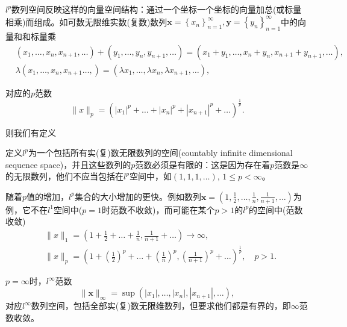 $l^p$数列空间反映这样的向量空间结构：通过一个坐标一个坐标的向量加总(或标量相乘)而组成。如可数无限维实数(复数)数列$\bm{x} = \left\{ x_n \right\}_{n=1}^{\infty}, \bm{y} = \left\{ y_n \right\}_{n=1}^{\infty}$中的向量和和标量乘
\begin{equation*}
  \begin{split}
    & \left( x_1, \ldots, x_n, x_{n+1}, \ldots \right) +
    \left( y_1, \ldots, y_n, y_{n+1}, \ldots \right)
    = \left( x_1+y_1, \ldots, x_n+y_n, x_{n+1}+y_{n+1}, \ldots \right), \\
    & \lambda \left( x_1, \ldots, x_n, x_{n+1} \ldots , \right) =
    \left( \lambda x_1, \ldots, \lambda x_n, \lambda x_{n+1} , \ldots \right),
  \end{split}
\end{equation*}

对应的$p$范数
\begin{equation*}
  \| x\|_p = \left( |x_1|^p + \ldots + |x_n|^p + |x_{n+1}|^p + \ldots \right)^{\frac{1}{p}}.
\end{equation*}

则我们有定义
\begin{definition}[可数无限维数列空间]
  \label{definition:lp-lp-infinite-def}
  定义$l^p$为一个包括所有实(复)数无限数列的空间(countably infinite dimensional sequence space)，并且这些数列的$p$范数必须是有限的：这是因为存在着$p$范数是$\infty$的无限数列，他们不应当包括在$l^{p}$空间中，如$\left( 1,1,1,\ldots \right),\, 1 \le p < \infty$。
\end{definition}

随着$p$值的增加，$l^p$集合的大小增加的更快。例如数列$\bm{x} = \left(1, \frac{1}{2}, \ldots, \frac{1}{n}, \frac{1}{n+1},\ldots \right)$为例，它不在$l^1$空间中($p=1$时范数不收敛)，而可能在某个$p>1$的$l^{p}$的空间中(范数收敛)
\begin{equation*}
\begin{split}
  &\| x \|_1 = \left( 1 + \frac{1}{2} + \ldots + \frac{1}{n}, \frac{1}{n+1} + \ldots \right) \rightarrow \infty, \\
  &\| x \|_p = \left( 1 + \left(\frac{1}{2}\right)^p + \ldots + \left( \frac{1}{n} \right)^p, \left( \frac{1}{n+1}\right)^p + \ldots \right)^{\frac{1}{p}}, \quad p >1.
\end{split}
\end{equation*}

$p = \infty$时，$l^{\infty}$范数
\begin{equation*}
  \| \bm{x} \|_{\infty} = \sup \left( |x_1|, \ldots, |x_n|, |x_{n+1}|, \ldots  \right),
\end{equation*}
对应$l^{\infty}$数列空间，包括全部实(复)数无限维数列，但要求他们都是有界的，即$\infty$范数收敛。

